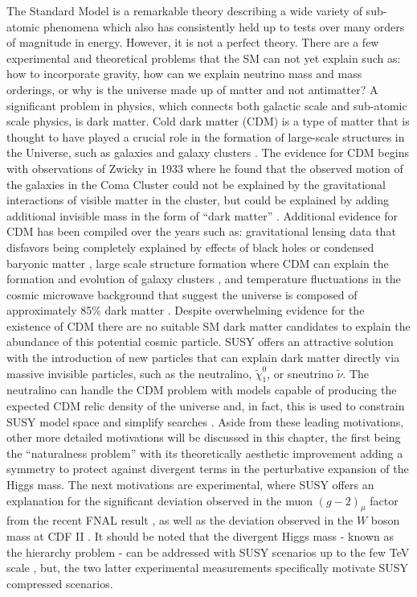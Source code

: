 The Standard Model is a remarkable theory describing a wide variety of sub-atomic phenomena which also has consistently held up to tests over many orders of magnitude in energy. However, it is not a perfect theory. There are a few  experimental and theoretical problems that the SM can not yet explain such as: how to incorporate gravity,  how can we explain neutrino mass and mass orderings, or why is the universe made up of matter and not antimatter?  
A significant problem in physics, which connects both galactic scale and sub-atomic scale physics, is dark matter. Cold dark matter (CDM) is a type of matter that is thought to have played a crucial role in the formation of large-scale structures in the Universe, such as galaxies and galaxy clusters \cite{Garrett:2010hd}. The evidence for CDM begins with observations of Zwicky in 1933 where he found that the observed motion of the galaxies in the Coma Cluster could not be explained by the gravitational interactions of visible matter in the cluster, but could be explained by adding additional invisible mass in the form of ``dark matter'' \cite{Zwicky:1933gu}. Additional evidence for CDM has been compiled over the years such as: gravitational lensing data that disfavors being completely explained by effects of black holes or condensed baryonic matter \cite{Massey:2007lens}, large scale structure formation where CDM can explain the formation and evolution of galaxy clusters \cite{Springel:2005}, and temperature fluctuations in the cosmic microwave background that suggest the universe is composed of approximately 85\% dark matter \cite{Planck:2018vyg}. Despite overwhelming evidence for the existence of CDM there are no suitable SM dark matter candidates to explain the abundance of this potential cosmic particle. SUSY offers an attractive solution with the introduction of new particles that can explain dark matter directly via massive invisible particles, such as the neutralino, $\tilde{\chi}_1^0$, or sneutrino $\tilde{\nu}$. The neutralino can handle the CDM problem with models capable of producing the expected CDM relic density of the universe and, in fact, this is used to constrain SUSY model space and simplify searches \cite{SvenTalkgm2}. Aside from these leading motivations, other more detailed motivations will be discussed in this chapter, the first being the ``naturalness problem'' with its theoretically aesthetic improvement adding a symmetry to protect against divergent terms in the perturbative expansion of the Higgs mass. The next motivations are experimental, where SUSY offers an explanation for the significant deviation observed in the muon $(g-2)_\mu$ factor from the recent FNAL result \cite{Muong-2:2021ojo}, as well as the deviation observed in the $W$ boson mass at CDF II \cite{CDF:2022hxs}. It should be noted that the divergent Higgs mass - known as the hierarchy problem - can be addressed with SUSY scenarios up to the few TeV scale \cite{Barbieri:1987fn}, but, the two latter experimental measurements specifically motivate SUSY compressed scenarios.



